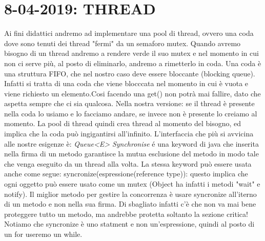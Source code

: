 

\newpage
\section{8-04-2019: THREAD}

\noindent Ai fini didattici andremo ad implementare una pool di thread, ovvero una coda dove sono tenuti dei thread "fermi" da un semaforo mutex. Quando avremo bisogno di un thread andremo a rendere verde il suo mutex e nel momento in cui non ci serve più, al posto di eliminarlo, andremo a rimetterlo in coda. \newline
Una coda è una struttura FIFO, che nel nostro caso deve essere bloccante (blocking queue). Infatti si tratta di una coda che viene blocccata nel momento in cui è vuota e viene richiesto un elemento.Cosi facendo una get() non potrà mai fallire, dato che aspetta sempre che ci sia qualcosa. \newline
Nella nostra versione: se il thread è presente nella coda lo usiamo e lo facciamo andare, se invece non è presente lo creiamo al momento. La pool di thread quindi crea thread al momento del bisogno, ed implica che la coda può ingigantirsi all'infinito. \newline
L'interfaccia che più si avvicina alle nostre esigenze è: \textit{Queue<E>} \newline
\textit{Synchronise} é una keyword di java che inserita nella firma di un metodo garantisce la mutua esclusione del metodo in modo tale che venga eseguito da un thread alla volta. La stessa keyword può essere usata anche come segue: syncronize(espressione(reference type)): questo implica che ogni oggetto può essere usato come un mutex (Object ha infatti i metodi "wait" e notify). \newline
Il miglior metodo per gestire la concorrenza è usare syncronize all'iterno di un metodo e non nella sua firma. \newline
Di sbagliato infatti c'è che non va mai bene proteggere tutto un metodo, ma andrebbe protetta soltanto la sezione critica!
Notiamo che syncronize è uno statment e non un'espressione, quindi al posto di un for useremo un while.

